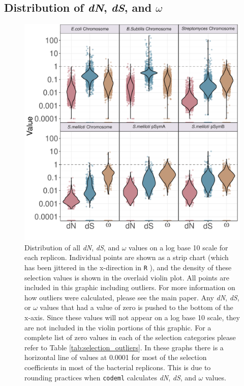 \documentclass[11pt]{article}
\newcommand{\dn}{\textit{dN}\xspace}
\newcommand{\ds}{\textit{dS}\xspace}
\begin{document}
	\subsection{Distribution of \dn, \ds, and $\omega$}
	\begin{figure}
		\centering
		\includegraphics[width=\textwidth]{./figs/ALL_BAC_dN_dS_omega_violinplots.pdf}
		\caption{\label{fig:box_plots} Distribution of all \dn, \ds, and $\omega$ values on a log base 10 scale for each replicon. Individual points are shown as a strip chart (which has been jittered in the x-direction in \texttt{R} \citep{Wickham2019}), and the density of these selection values is shown in the overlaid violin plot. All points are included in this graphic including outliers. For more information on how outliers were calculated, please see the main paper. Any \dn, \ds, or $\omega$ values that had a value of zero is pushed to the bottom of the x-axis. Since these values will not appear on a log base 10 scale, they are not included in the violin portions of this graphic. For a complete list of zero values in each of the selection categories please refer to Table \ref{tab:selection_outliers}. In these graphs there is a horizontal line of values at 0.0001 for most of the selection coefficients in most of the bacterial replicons. This is due to rounding practices when \texttt{codeml} \citep{Yang97} calculates \dn, \ds, and $\omega$ values.}
	\end{figure}
\end{document}
